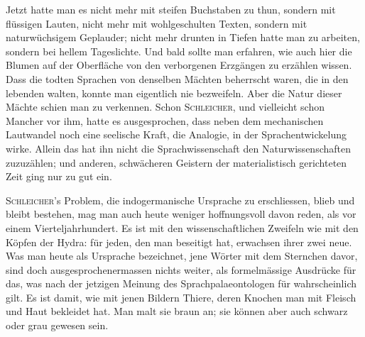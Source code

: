 {Jetzt hatte man es nicht mehr mit steifen Buchstaben zu thun, sondern mit flüssigen Lauten, nicht mehr mit wohlgeschulten Texten, sondern mit naturwüchsigem Geplauder; nicht mehr drunten in  Tiefen hatte man zu arbeiten, sondern bei hellem Tageslichte. Und bald sollte man erfahren, wie auch hier die Blumen auf der Oberfläche von den verborgenen Erzgängen zu erzählen wissen. Dass die todten Sprachen von denselben \label{fp.184} Mächten beherrscht waren, die in den lebenden walten, konnte man eigentlich nie bezweifeln. Aber die Natur dieser Mächte schien man zu verkennen. Schon \textsc{Schleicher}, und vielleicht schon Mancher vor ihm, hatte es ausgesprochen, dass neben dem mechanischen Lautwandel noch eine seelische Kraft, die Analogie, in der Sprachentwickelung \mbox{wirke}. Allein das hat ihn nicht  die Sprachwissenschaft den Naturwissenschaften zuzuzählen; und anderen, schwächeren Geistern der materialistisch gerichteten Zeit ging  nur zu gut ein.

\textsc{Schleicher}’s Problem, die indogermanische Ursprache zu erschliessen, blieb und bleibt bestehen, mag man auch heute weniger hoffnungsvoll davon reden, als vor einem Vierteljahrhundert. Es ist mit den wissenschaftlichen Zweifeln wie mit den Köpfen der Hydra: für jeden, den man beseitigt hat, erwachsen ihrer zwei neue. Was man heute als Ursprache bezeichnet, jene Wörter mit dem Sternchen davor, sind doch ausgesprochenermassen nichts weiter, als formelmässige Ausdrücke für das, was nach der jetzigen Meinung des Sprachpalaeon\label{sp.174}tologen für wahrscheinlich gilt. Es ist damit, wie mit jenen Bildern  Thiere, deren Knochen man mit Fleisch und Haut bekleidet hat. Man malt sie braun an; sie können aber auch schwarz oder grau gewesen sein. 

}
